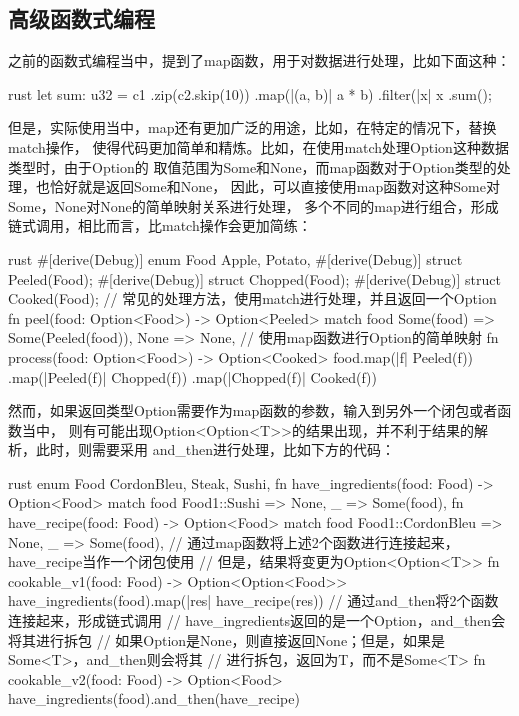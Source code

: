 \subsection{高级函数式编程}
之前的函数式编程当中，提到了map函数，用于对数据进行处理，比如下面这种：
\begin{code-block}{rust}
let sum: u32 = c1
    .zip(c2.skip(10))
    .map(|(a, b)| a * b)
    .filter(|x| x %
    .sum();
\end{code-block}

但是，实际使用当中，map还有更加广泛的用途，比如，在特定的情况下，替换match操作，
使得代码更加简单和精炼。比如，在使用match处理Option这种数据类型时，由于Option的
取值范围为Some和None，而map函数对于Option类型的处理，也恰好就是返回Some和None，
因此，可以直接使用map函数对这种Some对Some，None对None的简单映射关系进行处理，
多个不同的map进行组合，形成链式调用，相比而言，比match操作会更加简练：
\begin{code-block}{rust}
#[derive(Debug)]
enum Food {
    Apple,
    Potato,
}
#[derive(Debug)]
struct Peeled(Food);
#[derive(Debug)]
struct Chopped(Food);
#[derive(Debug)]
struct Cooked(Food);
// 常见的处理方法，使用match进行处理，并且返回一个Option
fn peel(food: Option<Food>) -> Option<Peeled> {
    match food {
        Some(food) => Some(Peeled(food)),
        None => None,
    }
}
// 使用map函数进行Option的简单映射
fn process(food: Option<Food>) -> Option<Cooked> {
    food.map(|f| Peeled(f))
        .map(|Peeled(f)| Chopped(f))
        .map(|Chopped(f)| Cooked(f))
}
\end{code-block}

然而，如果返回类型Option需要作为map函数的参数，输入到另外一个闭包或者函数当中，
则有可能出现Option<Option<T>>的结果出现，并不利于结果的解析，此时，则需要采用
and\_then进行处理，比如下方的代码：
\begin{code-block}{rust}
enum Food {
    CordonBleu,
    Steak,
    Sushi,
}
fn have_ingredients(food: Food) -> Option<Food> {
    match food {
        Food1::Sushi => None,
        _ => Some(food),
    }
}
fn have_recipe(food: Food) -> Option<Food> {
    match food {
        Food1::CordonBleu => None,
        _ => Some(food),
    }
}
// 通过map函数将上述2个函数进行连接起来，have_recipe当作一个闭包使用
// 但是，结果将变更为Option<Option<T>>
fn cookable_v1(food: Food) -> Option<Option<Food>> {
    have_ingredients(food).map(|res| have_recipe(res))
}
// 通过and_then将2个函数连接起来，形成链式调用
// have_ingredients返回的是一个Option，and_then会将其进行拆包
// 如果Option是None，则直接返回None；但是，如果是Some<T>，and_then则会将其
// 进行拆包，返回为T，而不是Some<T>
fn cookable_v2(food: Food) -> Option<Food> {
    have_ingredients(food).and_then(have_recipe)
}
\end{code-block}

